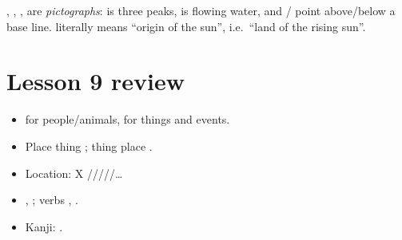 \begin{aside}
, , ,  are \emph{pictographs}:  is three peaks, 
is flowing water, and / point above/below a base line.  literally
means ``origin of the sun'', i.e.\ ``land of the rising sun''.
\end{aside}

\section*{Lesson 9 review}
\begin{itemize}
  \item {} for people/animals,  for things and events.
  \item Place  thing  ; thing  place  .
  \item Location: X  /////\ldots
  \item {}, ; verbs , .
  \item Kanji: .
\end{itemize}
